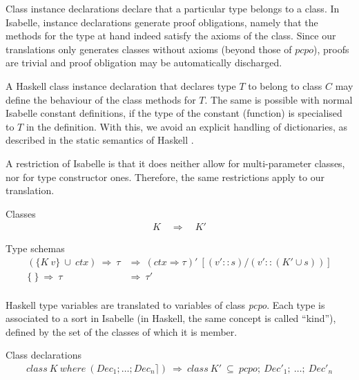 \documentclass{llncs}
\begin{document}
Class instance declarations declare that a particular type belongs to
a class. In Isabelle, instance declarations generate proof
obligations, namely that the methods for the type at hand indeed
satisfy the axioms of the class. Since our translations only
generates classes without axioms (beyond those of $pcpo$), proofs are trivial and proof obligation
may be automatically discharged.


A Haskell class instance declaration that declares type $T$
to belong to class $C$ may define the behaviour of the
class methods for $T$. The same is possible with
normal Isabelle constant definitions, if the type of the
constant (function) is specialised to $T$ in the definition.
With this, we avoid an explicit handling of dictionaries, as
described in the static semantics of Haskell \cite{journals/jfp/Faxen02}.



A restriction of Isabelle is that it does neither allow for
multi-parameter classes, nor for type constructor ones. Therefore, the
same restrictions apply to our translation.
\medskip

\noindent Classes
$$\begin{array}{l}
  K \quad \Longrightarrow \quad K' 
\end{array}$$

\noindent Type schemas
$$\begin{array}{ll} 
  (\{K \ v\} \ \cup \ ctx) \ \Rightarrow \ \tau & \Longrightarrow 
  \ (ctx \Rightarrow \tau)'  
           \ [(v'::s) / (v'::({K'} \cup s))]  \\
  \{ \ \} \ \Rightarrow \ \tau & \Longrightarrow \ \tau'
\end{array}$$\\

Haskell type variables are translated to variables of class
\emph{pcpo}.  Each type is associated to a sort in Isabelle (in
Haskell, the same concept is called ``kind''), defined by the set of
the classes of which it is member.  
\medskip

\noindent Class declarations
$$\begin{array}{l} class \ K \ where \ (Dec_1; \ldots; Dec_n \rceil) \ 
  \Longrightarrow \ class \ K' \ \subseteq
  \ pcpo; \ Dec'_1; \ \ldots; \ Dec'_n \\
\end{array}$$
        
\end{document}
